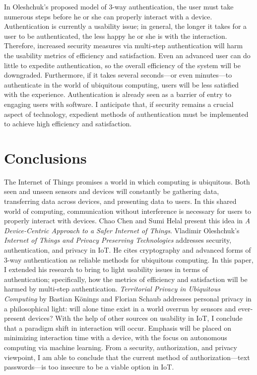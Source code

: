 \documentclass[11pt, oneside]{article}   	%
\begin{document}
In Oleshchuk's proposed model of 3-way authentication, the user must take numerous steps before he or she can properly interact with a device. Authentication is currently a usability issue; in general, the longer it takes for a user to be authenticated, the less happy he or she is with the interaction. Therefore, increased security measures via multi-step authentication will harm the usability metrics of efficiency and satisfaction. Even an advanced user can do little to expedite authentication, so the overall efficiency of the system will be downgraded. Furthermore, if it takes several seconds---or even minutes---to authenticate in the world of ubiquitous computing, users will be less satisfied with the experience. Authentication is already seen as a barrier of entry to engaging users with software. I anticipate that, if security remains a crucial aspect of technology, expedient methods of authentication must be implemented to achieve high efficiency and satisfaction.

\section{Conclusions}
The Internet of Things promises a world in which computing is ubiquitous. Both seen and unseen sensors and devices will constantly be gathering data, transferring data across devices, and presenting data to users. In this shared world of computing, communication without interference is necessary for users to properly interact with devices. Chao Chen and Sumi Helal present this idea in \textit{A Device-Centric Approach to a Safer Internet of Things}. Vladimir Oleshchuk's \textit{Internet of Things and Privacy Preserving Technologies} addresses security, authentication, and privacy in IoT. He cites cryptography and advanced forms of 3-way authentication as reliable methods for ubiquitous computing. In this paper, I extended his research to bring to light usability issues in terms of authentication; specifically, how the metrics of efficiency and satisfaction will be harmed by multi-step authentication. \textit{Territorial Privacy in Ubiquitous Computing} by Bastian K{\"o}nings and Florian Schaub addresses personal privacy in a philosophical light: will alone time exist in a world overrun by sensors and ever-present devices? With the help of other sources on usability in IoT, I conclude that a paradigm shift in interaction will occur. Emphasis will be placed on minimizing interaction time with a device, with the focus on autonomous computing via machine learning. From a security, authorization, and privacy viewpoint, I am able to conclude that the current method of authorization---text passwords---is too insecure to be a viable option in IoT.
\end{document}
